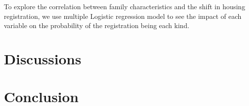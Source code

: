 \documentclass[11pt]{article}
\begin{document}
To explore the correlation between family characteristics and the shift in housing registration, we use multiple Logistic regression model to see the impact of each variable on the probability of the registration being each kind.




\section{Discussions} \label{sec:discussion}

\section{Conclusion} \label{sec:conclusion}



\singlespacing
\setlength\bibsep{0pt}






\end{document}
